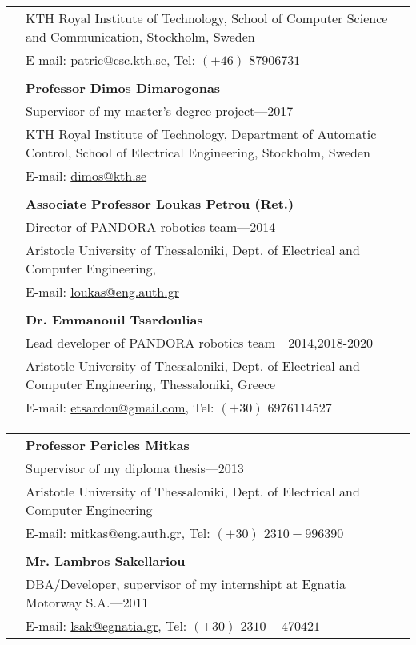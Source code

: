 \documentclass[a4paper,10pt,twoside]{article}
\begin{document}
\begin{tabular}{rp{14cm}}
&KTH Royal Institute of Technology, School of Computer Science and Communication, Stockholm, Sweden \\
& E-mail: \href{mailto: patric@csc.kth.se}{patric@csc.kth.se}, Tel: $(+46)$ $8 790 67 31$ \\
&\\
& \textbf{Professor Dimos Dimarogonas}\\
& {Supervisor of my master's degree project}---2017\\
&KTH Royal Institute of Technology, Department of Automatic Control, School of Electrical Engineering, Stockholm, Sweden \\
& E-mail: \href{mailto: dimos@kth.se}{dimos@kth.se} \\
&\\
& \textbf{Associate Professor Loukas Petrou (Ret.)}\\
& {Director of PANDORA robotics team}---2014\\
&Aristotle University of Thessaloniki, Dept. of Electrical and Computer Engineering,\\
& E-mail: \href{mailto: loukas@eng.auth.gr}{loukas@eng.auth.gr} \\
&\\
& \textbf{Dr. Emmanouil Tsardoulias}\\
& {Lead developer of PANDORA robotics team}---2014,2018-2020\\
&Aristotle University of Thessaloniki, Dept. of Electrical and Computer Engineering, Thessaloniki, Greece \\
& E-mail: \href{mailto: etsardou@gmail.com}{etsardou@gmail.com}, Tel: $(+30)$ $697 611 4527$ \\
\end{tabular}
\newpage
\begin{tabular}{rp{14cm}}
& \textbf{Professor Pericles Mitkas}\\
& {Supervisor of my diploma thesis}---2013\\
&Aristotle University of Thessaloniki, Dept. of Electrical and Computer Engineering\\
& E-mail: \href{mailto: mitkas@eng.auth.gr}{mitkas@eng.auth.gr}, Tel: $(+30)$ $2310-996390$ \\
&\\
& \textbf{Mr. Lambros Sakellariou}\\
& {DBA/Developer, supervisor of my internshipt at Egnatia Motorway S.A.}---2011\\
& E-mail: \href{mailto: lsak@egnatia.gr}{lsak@egnatia.gr}, Tel: $(+30)$ $2310 - 470421$ \\
\end{tabular}
\end{document}
